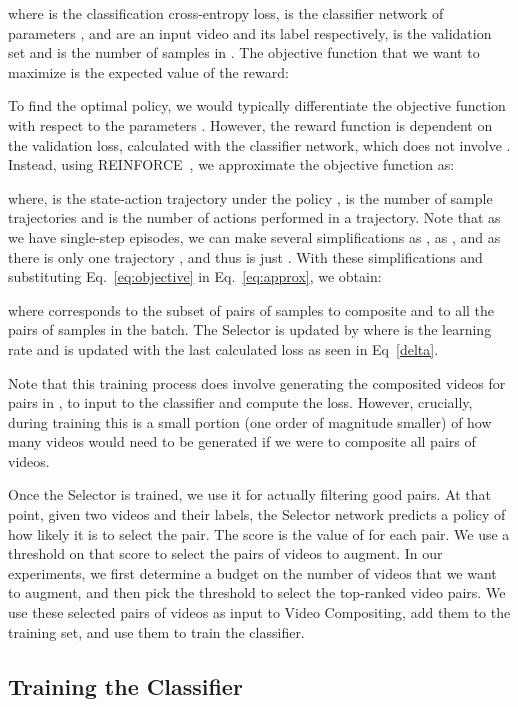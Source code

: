 \documentclass[runningheads]{llncs}
\newcommand{\VideoMix}{Video Compositing\xspace}
\begin{document}
where  is the classification cross-entropy loss,  is the classifier network of parameters ,  and  are an input video and its label respectively,  is the validation set and  is the number of samples in . The objective function that we want to maximize is the expected value of the reward: 

To find the optimal policy, we would typically differentiate the objective function with respect to the parameters . However, the reward function is dependent on the validation loss, calculated with the classifier network, which does not involve . Instead, using REINFORCE~\cite{reinforce}, we approximate the objective function as: 


where,  is the  state-action trajectory under the policy ,  is the number of sample trajectories and  is the number of actions performed in a trajectory. Note that as we have single-step episodes, we can make several simplifications as , as , and as there is only one trajectory , and thus  is just .
With these simplifications and substituting Eq.~\ref{eq:objective} in  Eq.~\ref{eq:approx}, we obtain: 

where  corresponds to the subset of pairs of samples to composite and  to all the pairs of samples in the batch. The Selector is updated by  where  is the learning rate and  is updated with the last calculated loss as seen in Eq~\ref{delta}.




Note that this training process does involve generating the composited videos for pairs in , to input to the classifier and compute the loss. However, crucially, during training this is a small portion (one order of magnitude smaller) of how many videos would need to be generated if we were to composite all pairs of videos. 



Once the Selector is trained, we use it for actually filtering good pairs. At that point, given two videos and their labels, the Selector network predicts a policy  of how likely it is to select the pair. The score  is the value of  for each pair. We use a threshold on that score to select the pairs of videos to augment. In our experiments, we first determine a budget on the number of videos that we want to augment, and then pick the threshold to select the top-ranked video pairs. We use these selected pairs of videos as input to \VideoMix, add them to the training set, and use them to train the classifier. 

\subsection{Training the Classifier}
\end{document}
